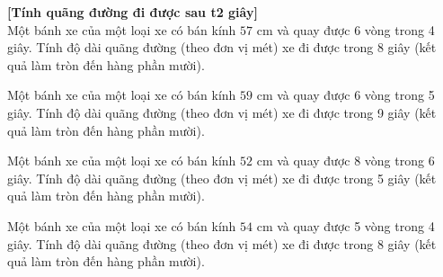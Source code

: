 \documentclass[12pt,a4paper]{article}
\begin{document}
\begin{ex}\textbf{[Tính quãng đường đi được sau t2 giây]} \\
 Một bánh xe của một loại xe có bán kính ${57}$ cm và quay được 6 vòng trong 4 giây. Tính độ dài quãng đường (theo đơn vị mét) xe đi được trong 8 giây (kết quả làm tròn đến hàng phần mười). 

\end{ex}

\begin{ex}
 Một bánh xe của một loại xe có bán kính ${59}$ cm và quay được 6 vòng trong 5 giây. Tính độ dài quãng đường (theo đơn vị mét) xe đi được trong 9 giây (kết quả làm tròn đến hàng phần mười). 

\end{ex}

\begin{ex}
 Một bánh xe của một loại xe có bán kính ${52}$ cm và quay được 8 vòng trong 6 giây. Tính độ dài quãng đường (theo đơn vị mét) xe đi được trong 5 giây (kết quả làm tròn đến hàng phần mười). 

\end{ex}

\begin{ex}
 Một bánh xe của một loại xe có bán kính ${54}$ cm và quay được 5 vòng trong 4 giây. Tính độ dài quãng đường (theo đơn vị mét) xe đi được trong 8 giây (kết quả làm tròn đến hàng phần mười). 

\end{ex}
\end{document}
